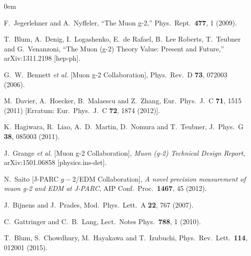 \documentclass[preprint,12pt,3p]{elsarticle}
\newcommand{\0}{}
\begin{document}
\begin{thebibliography}{99} \itemsep0em

  F.~Jegerlehner and A.~Nyffeler,
  ``The Muon g-2,''
  Phys.\ Rept.\  {\bf 477}, 1 (2009).

  T.~Blum, A.~Denig, I.~Logashenko, E.~de Rafael, B.~Lee Roberts, T.~Teubner and G.~Venanzoni,
  ``The Muon (g-2) Theory Value: Present and Future,''
  arXiv:1311.2198 [hep-ph].

  G.~W.~Bennett {\it et al.} [Muon g-2 Collaboration],
  Phys.\ Rev.\ D {\bf 73}, 072003 (2006).

  M.~Davier, A.~Hoecker, B.~Malaescu and Z.~Zhang,
  Eur.\ Phys.\ J.\ C {\bf 71}, 1515 (2011) 
   [Erratum: Eur.\ Phys.\ J.\ C {\bf 72}, 1874 (2012)].

  K.~Hagiwara, R.~Liao, A.~D.~Martin, D.~Nomura and T.~Teubner,
  J.\ Phys.\ G {\bf 38}, 085003 (2011).

  J.~Grange {\it et al.} [Muon g-2 Collaboration],
  {\it Muon (g-2) Technical Design Report},
  arXiv:1501.06858 [physics.ins-det].

  N.~Saito [J-PARC $g-2$/EDM Collaboration],
  {\it A novel precision measurement of muon g-2 and EDM at J-PARC},
  AIP Conf.\ Proc.\  {\bf 1467}, 45 (2012).

  J.~Bijnens and J.~Prades,
  Mod.\ Phys.\ Lett.\ A {\bf 22}, 767 (2007).

  C.~Gattringer and C.~B.~Lang,
  Lect.\ Notes Phys.\  {\bf 788}, 1 (2010).

  T.~Blum, S.~Chowdhury, M.~Hayakawa and T.~Izubuchi,
  Phys.\ Rev.\ Lett.\  {\bf 114}, 012001 (2015).


\end{thebibliography}
\end{document}
